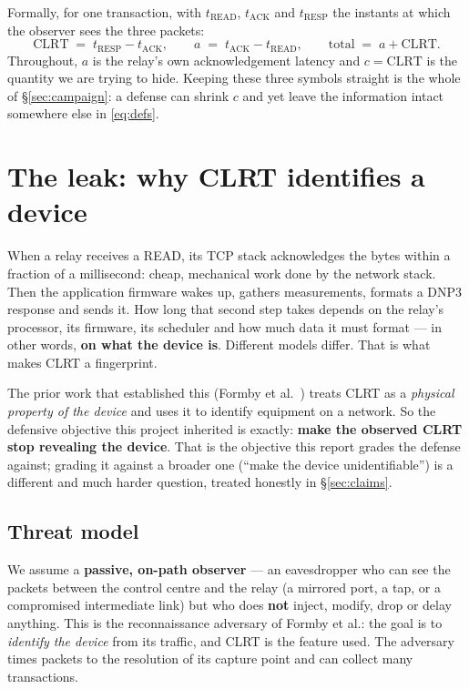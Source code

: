 \documentclass[10pt,a4paper,oneside]{article}
\begin{document}
Formally, for one transaction, with $t_{\mathrm{READ}}$, $t_{\mathrm{ACK}}$ and
$t_{\mathrm{RESP}}$ the instants at which the observer sees the three packets:
\begin{equation}
\mathrm{CLRT} \;=\; t_{\mathrm{RESP}} - t_{\mathrm{ACK}},
\qquad
a \;=\; t_{\mathrm{ACK}} - t_{\mathrm{READ}},
\qquad
\text{total} \;=\; a + \mathrm{CLRT}.
\label{eq:defs}
\end{equation}
Throughout, $a$ is the relay's own acknowledgement latency and $c=\mathrm{CLRT}$ is the
quantity we are trying to hide. Keeping these three symbols straight is the whole of
\S\ref{sec:campaign}: a defense can shrink $c$ and yet leave the information intact
somewhere else in \eqref{eq:defs}.

\section{The leak: why CLRT identifies a device}

When a relay receives a READ, its TCP stack acknowledges the bytes within a fraction of a
millisecond: cheap, mechanical work done by the network stack. Then the application
firmware wakes up, gathers measurements, formats a DNP3 response and sends it. How long
that second step takes depends on the relay's processor, its firmware, its scheduler and
how much data it must format --- in other words, \textbf{on what the device is}. Different
models differ. That is what makes CLRT a fingerprint.

The prior work that established this (Formby et al.~\cite{formby2016control}) treats CLRT as
a \emph{physical property of the device} and uses it to identify equipment on a network. So the defensive
objective this project inherited is exactly: \textbf{make the observed CLRT stop revealing
the device}. That is the objective this report grades the defense against; grading it
against a broader one (``make the device unidentifiable'') is a different and much harder
question, treated honestly in \S\ref{sec:claims}.

\subsection{Threat model}

We assume a \textbf{passive, on-path observer} --- an eavesdropper who can see the packets
between the control centre and the relay (a mirrored port, a tap, or a compromised
intermediate link) but who does \textbf{not} inject, modify, drop or delay anything. This is
the reconnaissance adversary of Formby et al.: the goal is to \emph{identify the device} from
its traffic, and CLRT is the feature used. The adversary times packets to the resolution of
its capture point and can collect many transactions.
\end{document}
